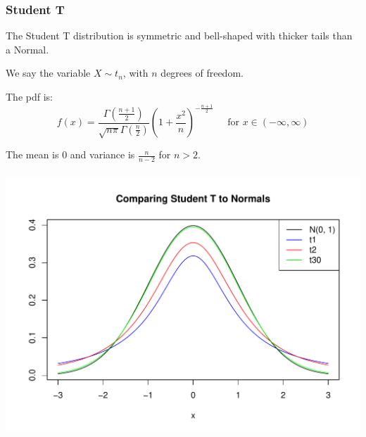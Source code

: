 \documentclass[t,xcolor=pdftex,dvipsnames,table]{beamer}\usepackage[]{graphicx}\usepackage[]{color}
\makeatletter
\def\maxwidth{ %
  \ifdim\Gin@nat@width>\linewidth
    \linewidth
  \else
    \Gin@nat@width
  \fi
}
\newenvironment{knitrout}{}{} %
\makeatother
\begin{document}
\begin{frame}\frametitle{Student T}

\begin{definition}
The \alert{Student T distribution} is symmetric and bell-shaped with thicker tails than a Normal. 

\vspace{.5cm}
We say the variable $X \sim t_{n}$, with $n$ degrees of freedom.

\vspace{.5cm}
The pdf is:
\[ f(x)  =  \frac{ \Gamma(\frac{n+1}{2})}  { \sqrt{n \pi} \Gamma(\frac{n}{2})}
(1+ \frac{x^2}{n})^{-\frac{n+1}{2}}
\;\;\;\;\; \mbox{for }  x \in (- \infty, \infty) \]
\hyperlink{Normalpdf}{} 

\vspace{.5cm}
The mean is 0 and variance is $\frac{n}{n-2}$ for $n > 2$.

\end{definition}
\end{frame}

\begin{frame}[fragile]\frametitle{}

\begin{knitrout}
\color{fgcolor}
\includegraphics[width=\maxwidth]{figure/unnamed-chunk-97-1} 

\end{knitrout}
\end{frame}
 
\end{document}
